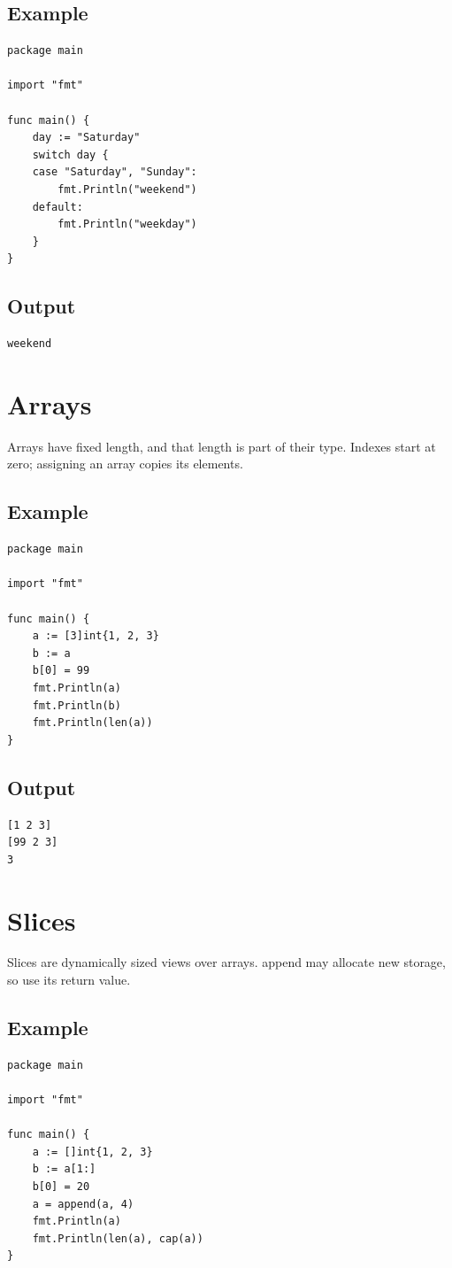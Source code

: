 \documentclass[10pt,oneside]{article}
\newcommand{\sectionline}{\par\vspace{4pt}{\color{rule}\hrule height .5pt}\vspace{7pt}\color{ink}\noindent}
\begin{document}
\subsection*{Example}
\begin{lstlisting}[style=gocode]
package main

import "fmt"

func main() {
	day := "Saturday"
	switch day {
	case "Saturday", "Sunday":
		fmt.Println("weekend")
	default:
		fmt.Println("weekday")
	}
}
\end{lstlisting}
\subsection*{Output}
\begin{lstlisting}[style=terminal]
weekend
\end{lstlisting}
\clearpage
\section{Arrays}
\sectionline
Arrays have fixed length, and that length is part of their type. Indexes start at zero; assigning an array copies its elements.\par
\subsection*{Example}
\begin{lstlisting}[style=gocode]
package main

import "fmt"

func main() {
	a := [3]int{1, 2, 3}
	b := a
	b[0] = 99
	fmt.Println(a)
	fmt.Println(b)
	fmt.Println(len(a))
}
\end{lstlisting}
\subsection*{Output}
\begin{lstlisting}[style=terminal]
[1 2 3]
[99 2 3]
3
\end{lstlisting}
\clearpage
\section{Slices}
\sectionline
Slices are dynamically sized views over arrays. append may allocate new storage, so use its return value.\par
\subsection*{Example}
\begin{lstlisting}[style=gocode]
package main

import "fmt"

func main() {
	a := []int{1, 2, 3}
	b := a[1:]
	b[0] = 20
	a = append(a, 4)
	fmt.Println(a)
	fmt.Println(len(a), cap(a))
}
\end{lstlisting}
\end{document}
